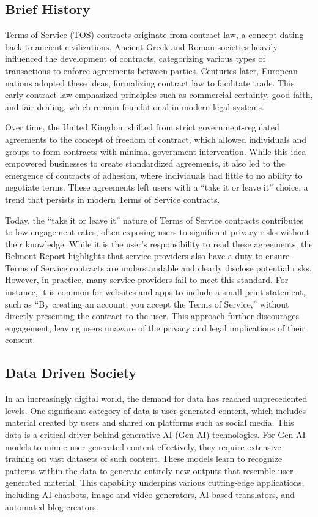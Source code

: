 \documentclass[sigconf, nonacm]{acmart}
\begin{document}
\subsection{Brief History}
Terms of Service (TOS) contracts originate from contract law, a concept dating back to ancient civilizations. Ancient Greek and Roman societies heavily influenced the development of contracts, categorizing various types of transactions to enforce agreements between parties. Centuries later, European nations adopted these ideas, formalizing contract law to facilitate trade. This early contract law emphasized principles such as commercial certainty, good faith, and fair dealing, which remain foundational in modern legal systems.

Over time, the United Kingdom shifted from strict government-regulated agreements to the concept of freedom of contract, which allowed individuals and groups to form contracts with minimal government intervention. While this idea empowered businesses to create standardized agreements, it also led to the emergence of contracts of adhesion, where individuals had little to no ability to negotiate terms. These agreements left users with a “take it or leave it” choice, a trend that persists in modern Terms of Service contracts.

Today, the “take it or leave it” nature of Terms of Service contracts contributes to low engagement rates, often exposing users to significant privacy risks without their knowledge. While it is the user's responsibility to read these agreements, the Belmont Report highlights that service providers also have a duty to ensure Terms of Service contracts are understandable and clearly disclose potential risks. However, in practice, many service providers fail to meet this standard. For instance, it is common for websites and apps to include a small-print statement, such as “By creating an account, you accept the Terms of Service,” without directly presenting the contract to the user. This approach further discourages engagement, leaving users unaware of the privacy and legal implications of their consent.

\subsection{Data Driven Society}
In an increasingly digital world, the demand for data has reached unprecedented levels. One significant category of data is user-generated content, which includes material created by users and shared on platforms such as social media. This data is a critical driver behind generative AI (Gen-AI) technologies. For Gen-AI models to mimic user-generated content effectively, they require extensive training on vast datasets of such content. These models learn to recognize patterns within the data to generate entirely new outputs that resemble user-generated material. This capability underpins various cutting-edge applications, including AI chatbots, image and video generators, AI-based translators, and automated blog creators.
\end{document}
